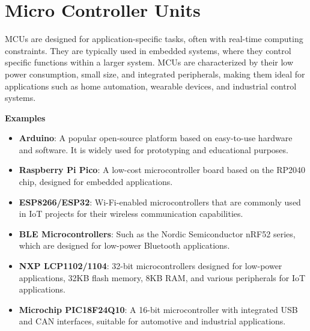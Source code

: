\section{Micro Controller Units}
MCUs are designed for application-specific tasks, often with real-time
computing constraints. They are typically used in embedded systems, where they
control specific functions within a larger system. MCUs are characterized by
their low power consumption, small size, and integrated peripherals, making
them ideal for applications such as home automation, wearable devices, and
industrial control systems.
\begin{tcolorbox}
    \textbf{Examples}
    \begin{itemize}
        \item \textbf{Arduino}: A popular open-source platform based on easy-to-use hardware and software. It is widely used for prototyping and educational purposes.
        \item \textbf{Raspberry Pi Pico}: A low-cost microcontroller board based on the RP2040 chip, designed for embedded applications.
        \item \textbf{ESP8266/ESP32}: Wi-Fi-enabled microcontrollers that are commonly used in IoT projects for their wireless communication capabilities.
        \item \textbf{BLE Microcontrollers}: Such as the Nordic Semiconductor nRF52 series, which are designed for low-power Bluetooth applications.
        \item \textbf{NXP LCP1102/1104}: 32-bit microcontrollers designed for low-power applications, 32KB flash memory, 8KB RAM, and various peripherals for IoT applications.
        \item \textbf{Microchip PIC18F24Q10}: A 16-bit microcontroller with integrated USB and CAN interfaces, suitable for automotive and industrial applications.
    \end{itemize}
\end{tcolorbox}
